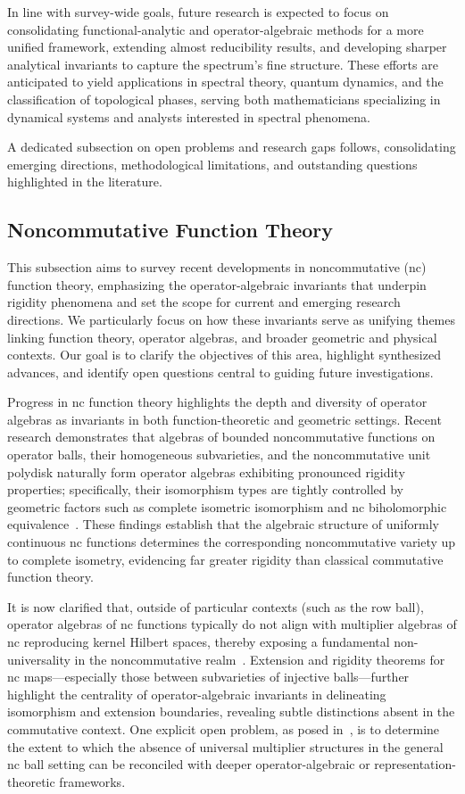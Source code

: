\documentclass[sigconf]{acmart}
\begin{document}
In line with survey-wide goals, future research is expected to focus on consolidating functional-analytic and operator-algebraic methods for a more unified framework, extending almost reducibility results, and developing sharper analytical invariants to capture the spectrum's fine structure. These efforts are anticipated to yield applications in spectral theory, quantum dynamics, and the classification of topological phases, serving both mathematicians specializing in dynamical systems and analysts interested in spectral phenomena.

A dedicated subsection on open problems and research gaps follows, consolidating emerging directions, methodological limitations, and outstanding questions highlighted in the literature.

\subsection{Noncommutative Function Theory}

This subsection aims to survey recent developments in noncommutative (nc) function theory, emphasizing the operator-algebraic invariants that underpin rigidity phenomena and set the scope for current and emerging research directions. We particularly focus on how these invariants serve as unifying themes linking function theory, operator algebras, and broader geometric and physical contexts. Our goal is to clarify the objectives of this area, highlight synthesized advances, and identify open questions central to guiding future investigations.

Progress in nc function theory highlights the depth and diversity of operator algebras as invariants in both function-theoretic and geometric settings. Recent research demonstrates that algebras of bounded noncommutative functions on operator balls, their homogeneous subvarieties, and the noncommutative unit polydisk naturally form operator algebras exhibiting pronounced rigidity properties; specifically, their isomorphism types are tightly controlled by geometric factors such as complete isometric isomorphism and nc biholomorphic equivalence~\cite{ref98}. These findings establish that the algebraic structure of uniformly continuous nc functions determines the corresponding noncommutative variety up to complete isometry, evidencing far greater rigidity than classical commutative function theory.

It is now clarified that, outside of particular contexts (such as the row ball), operator algebras of nc functions typically do not align with multiplier algebras of nc reproducing kernel Hilbert spaces, thereby exposing a fundamental non-universality in the noncommutative realm~\cite{ref98}. Extension and rigidity theorems for nc maps---especially those between subvarieties of injective balls---further highlight the centrality of operator-algebraic invariants in delineating isomorphism and extension boundaries, revealing subtle distinctions absent in the commutative context. One explicit open problem, as posed in~\cite{ref98}, is to determine the extent to which the absence of universal multiplier structures in the general nc ball setting can be reconciled with deeper operator-algebraic or representation-theoretic frameworks.
\end{document}
